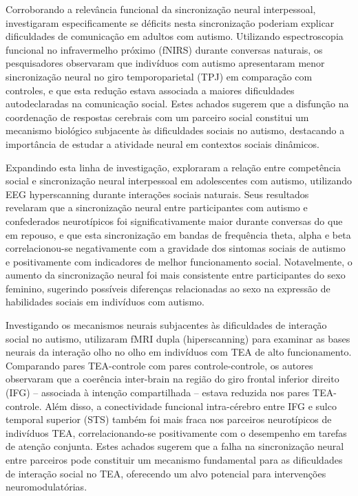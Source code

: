 Corroborando a relevância funcional da sincronização neural interpessoal,  investigaram especificamente se déficits nesta sincronização poderiam explicar dificuldades de comunicação em adultos com autismo. Utilizando espectroscopia funcional no infravermelho próximo (fNIRS) durante conversas naturais, os pesquisadores observaram que indivíduos com autismo apresentaram menor sincronização neural no giro temporoparietal (TPJ) em comparação com controles, e que esta redução estava associada a maiores dificuldades autodeclaradas na comunicação social. Estes achados sugerem que a disfunção na coordenação de respostas cerebrais com um parceiro social constitui um mecanismo biológico subjacente às dificuldades sociais no autismo, destacando a importância de estudar a atividade neural em contextos sociais dinâmicos.

Expandindo esta linha de investigação,  exploraram a relação entre competência social e sincronização neural interpessoal em adolescentes com autismo, utilizando EEG hyperscanning durante interações sociais naturais. Seus resultados revelaram que a sincronização neural entre participantes com autismo e confederados neurotípicos foi significativamente maior durante conversas do que em repouso, e que esta sincronização em bandas de frequência theta, alpha e beta correlacionou-se negativamente com a gravidade dos sintomas sociais de autismo e positivamente com indicadores de melhor funcionamento social. Notavelmente, o aumento da sincronização neural foi mais consistente entre participantes do sexo feminino, sugerindo possíveis diferenças relacionadas ao sexo na expressão de habilidades sociais em indivíduos com autismo.

Investigando os mecanismos neurais subjacentes às dificuldades de interação social no autismo,  utilizaram fMRI dupla (hiperscanning) para examinar as bases neurais da interação olho no olho em indivíduos com TEA de alto funcionamento. Comparando pares TEA-controle com pares controle-controle, os autores observaram que a coerência inter-brain na região do giro frontal inferior direito (IFG) – associada à intenção compartilhada – estava reduzida nos pares TEA-controle. Além disso, a conectividade funcional intra-cérebro entre IFG e sulco temporal superior (STS) também foi mais fraca nos parceiros neurotípicos de indivíduos TEA, correlacionando-se positivamente com o desempenho em tarefas de atenção conjunta. Estes achados sugerem que a falha na sincronização neural entre parceiros pode constituir um mecanismo fundamental para as dificuldades de interação social no TEA, oferecendo um alvo potencial para intervenções neuromodulatórias.

